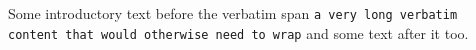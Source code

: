 Some introductory text before the verbatim span \verb|a very long verbatim content that would otherwise need to wrap| and some text after it too.
